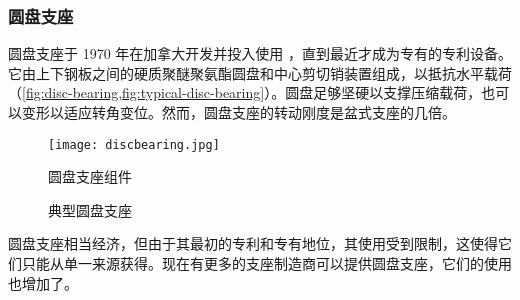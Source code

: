\subsubsection{圆盘支座}
圆盘支座于 1970 年在加拿大开发并投入使用 \cite{fyfe2006a}，直到最近才成为专有的专利设备。它由上下钢板之间的硬质聚醚聚氨酯圆盘和中心剪切销装置组成，以抵抗水平载荷（\cref{fig:disc-bearing,fig:typical-disc-bearing}）。圆盘足够坚硬以支撑压缩载荷，也可以变形以适应转角变位。然而，圆盘支座的转动刚度是盆式支座的几倍。

\begin{figure}
  \begin{minipage}[b]{0.35\linewidth}
    \texttt{[image: discbearing.jpg]}
    \caption{圆盘支座组件}
    \label{fig:disc-bearing}
  \end{minipage}%
  \begin{minipage}[b]{0.65\linewidth}
    \caption{典型圆盘支座}
    \label{fig:typical-disc-bearing}
  \end{minipage}
\end{figure}

圆盘支座相当经济，但由于其最初的专利和专有地位，其使用受到限制，这使得它们只能从单一来源获得。现在有更多的支座制造商可以提供圆盘支座，它们的使用也增加了。

